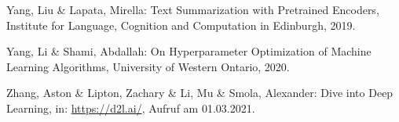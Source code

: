 \begin{thebibliography}{50}
Yang, Liu \& Lapata, Mirella: Text Summarization with Pretrained Encoders, Institute for Language, Cognition and Computation in Edinburgh, 2019.

Yang, Li \& Shami, Abdallah: On Hyperparameter Optimization of Machine Learning Algorithms, University of Western Ontario, 2020.

Zhang, Aston \& Lipton, Zachary \& Li, Mu \& Smola, Alexander: Dive into Deep Learning, in: \url{https://d2l.ai/}, Aufruf am 01.03.2021.

\end{thebibliography}
